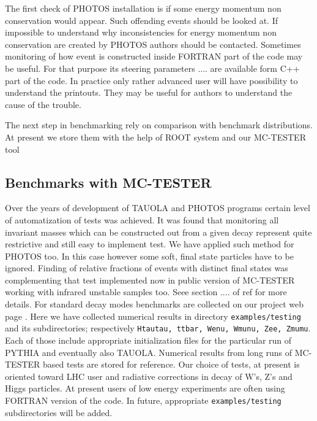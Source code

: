 \documentclass[]{Photos_interface_design}
\begin{document}
The first check of PHOTOS installation is if some energy momentum non 
conservation would appear. Such offending events should be looked at.
If impossible to understand why inconsistencies for energy momentum non 
conservation are created by PHOTOS authors should be contacted. Sometimes
monitoring of how event is constructed inside FORTRAN part of the code
may be useful. For that purpose its steering parameters .... are
available form C++ part of the code. In practice only rather
 advanced user will have possibility to understand the printouts. They may be 
useful for authors to understand the cause of the trouble.

The next step in benchmarking rely on comparison with benchmark distributions. 
At present we store them with the help of ROOT system and our MC-TESTER tool



\subsection{Benchmarks with MC-TESTER}
Over the years of development of TAUOLA and PHOTOS programs certain level 
of automatization of tests was achieved. It was found that monitoring all invariant masses which can be constructed out from a given decay represent 
quite restrictive and still easy to implement test. We have applied such method 
for PHOTOS too. In this case however some soft, final state particles have to be ignored. Finding of relative fractions of events with distinct final states 
was complementing that test implemented now in public version of MC-TESTER
working with infrared unstable samples too. Seee section .... of 
ref \cite{Davidson:2008ma} for more details. For standard decay modes benchmarks are collected on our project web page \cite{Photos_tests}.
Here we have collected numerical results in directory 
{\tt examples/testing} and its subdirectories; respectively  
{\tt Htautau, ttbar, Wenu, Wmunu, Zee, Zmumu}. Each of those include
appropriate initialization files for the particular run of PYTHIA and eventually also TAUOLA. Numerical results from long runs of MC-TESTER based tests
are stored for reference. Our choice of tests, at present is oriented toward 
LHC user and radiative corrections in decay of W's, Z's and Higgs particles.
At present users of low energy experiments are often using FORTRAN version 
of the code. In future, appropriate   {\tt examples/testing} subdirectories will
be added.
\end{document}
